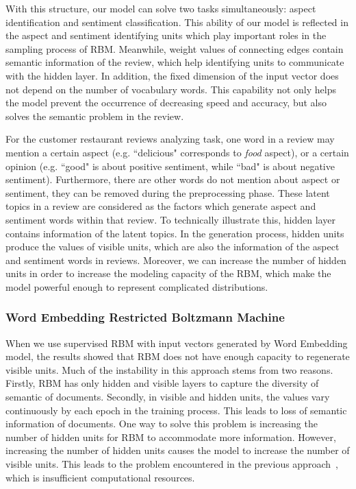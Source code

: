 With this structure, our model can solve two tasks simultaneously: aspect identification and sentiment classification.
This ability of our model is reflected in the aspect and sentiment identifying units which play important roles in the sampling process of RBM.
Meanwhile, weight values of connecting edges contain semantic information of the review, which help identifying units to communicate with the hidden layer.
In addition, the fixed dimension of the input vector does not depend on the number of vocabulary words.
This capability not only helps the model prevent the occurrence of decreasing speed and accuracy, but also solves the semantic problem in the review.

For the customer restaurant reviews analyzing task, one word in a review may mention a certain aspect (e.g. ``delicious" corresponds to \textit{food} aspect), or a certain opinion (e.g. ``good" is about positive sentiment, while ``bad" is about negative sentiment).
Furthermore, there are other words do not mention about aspect or sentiment, they can be removed during the preprocessing phase.
These latent topics in a review are considered as the factors which generate aspect and sentiment words within that review.
To technically illustrate this, hidden layer contains information of the latent topics.
In the generation process, hidden units produce the values of visible units, which are also the information of the aspect and sentiment words in reviews.
Moreover, we can increase the number of hidden units in order to increase the modeling capacity of the RBM, which make the model powerful enough to represent complicated distributions.

\subsubsection{Word Embedding Restricted Boltzmann Machine}

When we use supervised RBM with input vectors generated by Word Embedding model, the results showed that RBM does not have enough capacity to regenerate visible units.
Much of the instability in this approach stems from two reasons. 
Firstly, RBM has only hidden and visible layers to capture the diversity of semantic of documents.
Secondly, in visible and hidden units, the values vary continuously by each epoch in the training process.
This leads to loss of semantic information of documents.
One way to solve this problem is increasing the number of hidden units for RBM to accommodate more information.
However, increasing the number of hidden units causes the model to increase the number of visible units.
This leads to the problem encountered in the previous approach~\cite{serbm}, which is insufficient computational resources.

